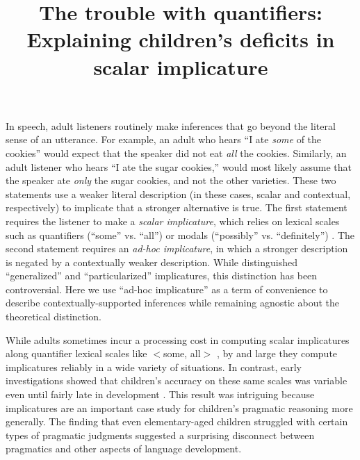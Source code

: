 \documentclass[man]{apa2}
\title{The trouble with quantifiers: Explaining children's deficits in scalar implicature}
\author{}
\affiliation{}
\begin{document}
\maketitle


\section{}

In speech, adult listeners routinely make inferences that go beyond the literal sense of an utterance. For example, an adult who hears ``I ate \emph{some} of the cookies'' would expect that the speaker did not eat \emph{all} the cookies. Similarly, an adult listener who hears ``I ate the sugar cookies,'' would most likely assume that the speaker ate \emph{only} the sugar cookies, and not the other varieties. These two statements use a weaker literal description (in these cases, scalar and contextual, respectively) to implicate that a stronger alternative is true. The first statement requires the listener to make a \emph{scalar implicature}, which relies on lexical scales such as quantifiers (``some'' vs. ``all'') or modals (``possibly'' vs. ``definitely'') \cite{horn1972}. The second statement requires an \emph{ad-hoc implicature}, in which a stronger description is negated by a contextually weaker description. While  distinguished ``generalized'' and ``particularized'' implicatures, this distinction has been controversial. Here we use ``ad-hoc implicature'' as a term of convenience to describe contextually-supported inferences while remaining agnostic about the theoretical distinction.

While adults sometimes incur a processing cost in computing scalar implicatures along quantifier lexical scales like  $<${\sc some, all}$>$ \cite{bott2004,grodner2010,huang2009b}, by and large they compute implicatures reliably in a wide variety of situations. In contrast, early investigations showed that children's accuracy on these same scales was variable even until fairly late in development \cite{noveck2001}. This result was intriguing because implicatures are an important case study for children's pragmatic reasoning more generally. The finding that even elementary-aged children struggled with certain types of pragmatic judgments suggested a surprising disconnect between pragmatics and other aspects of language development.
\end{document}
